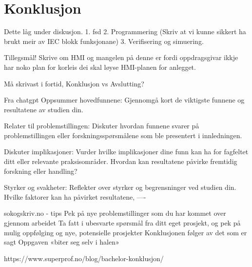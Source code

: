 \chapter{Konklusjon}
\thispagestyle{fancy}


Dette låg under diskusjon.
1. fsd 
2. Programmering (Skriv at vi kunne sikkert ha brukt meir av IEC blokk funksjonane)
3. Verifisering og simuering.

Tillegsmål!
Skrive om HMI og mangelen på denne er fordi oppdragsgivar ikkje har noko plan for korleis
dei skal løyse HMI-planen for anlegget. 


Må skrivast i fortid, Konklusjon vs Avslutting?

Fra chatgpt
Oppsummer hovedfunnene: Gjennomgå kort de viktigste funnene og resultatene av studien din.

Relater til problemstillingen: Diskuter hvordan funnene svarer på problemstillingen eller forskningsspørsmålene 
som ble presentert i innledningen.

Diskuter implikasjoner: Vurder hvilke implikasjoner dine funn kan ha for fagfeltet ditt eller relevante praksisområder. 
Hvordan kan resultatene påvirke fremtidig forskning eller handling?

Styrker og svakheter: Reflekter over styrker og begrensninger ved studien din. 
Hvilke faktorer kan ha påvirket resultatene,
----

sokogskriv.no - tips
Pek på nye problemstillinger som du har kommet over gjennom arbeidet
Ta fatt i ubesvarte spørsmål fra ditt eget prosjekt, og pek på mulig oppfølging og nye, potensielle prosjekter
Konklusjonen følger av det som er sagt
Oppgaven «biter seg selv i halen»

https://www.superprof.no/blog/bachelor-konklusjon/
